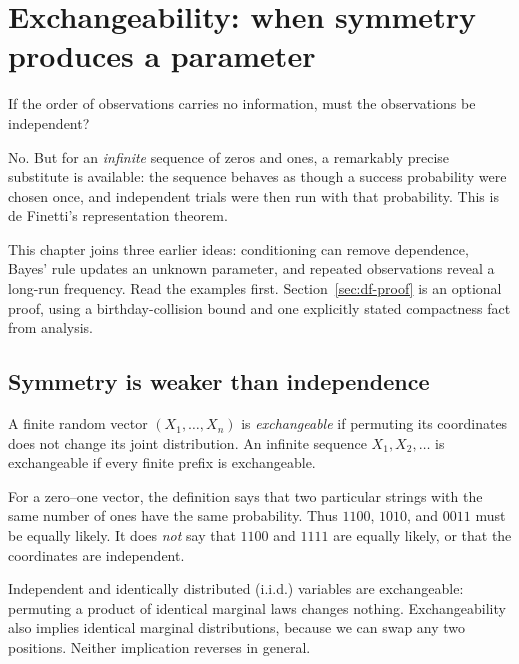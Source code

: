 \chapter[Exchangeability]{Exchangeability: when symmetry produces a parameter}
\label{ch:exchangeability}

\begin{question}
If the order of observations carries no information, must the observations be independent?
\end{question}

No. But for an \emph{infinite} sequence of zeros and ones, a remarkably precise substitute is available: the sequence behaves as though a success probability were chosen once, and independent trials were then run with that probability. This is de Finetti's representation theorem.

This chapter joins three earlier ideas: conditioning can remove dependence, Bayes' rule updates an unknown parameter, and repeated observations reveal a long-run frequency. Read the examples first. Section~\ref{sec:df-proof} is an optional proof, using a birthday-collision bound and one explicitly stated compactness fact from analysis.

\section{Symmetry is weaker than independence}

\begin{definition}
A finite random vector $(X_1,\ldots,X_n)$ is \emph{exchangeable} if permuting its coordinates does not change its joint distribution. An infinite sequence $X_1,X_2,\ldots$ is exchangeable if every finite prefix is exchangeable.
\end{definition}

For a zero--one vector, the definition says that two particular strings with the same number of ones have the same probability. Thus $1100$, $1010$, and $0011$ must be equally likely. It does \emph{not} say that $1100$ and $1111$ are equally likely, or that the coordinates are independent.

Independent and identically distributed (i.i.d.) variables are exchangeable: permuting a product of identical marginal laws changes nothing. Exchangeability also implies identical marginal distributions, because we can swap any two positions. Neither implication reverses in general.

